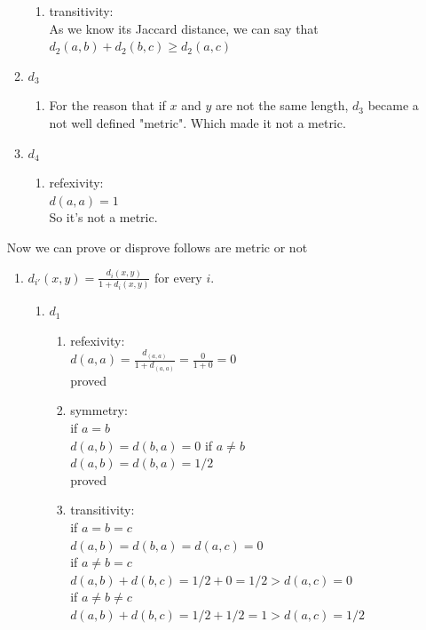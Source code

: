 \documentclass{article}
\begin{document}
\begin{enumerate}
\begin{enumerate}
\begin{enumerate}
		\item transitivity:\\
		As we know its Jaccard distance, we can say that\\
		$d_2(a,b) + d_2(b,c) \geq d_2(a,c)$\\
	\end{enumerate}
	\item $d_3$
		\begin{enumerate}
			\item For the reason that if $x$ and $y$ are not the same length, $d_3$ became a not well defined "metric". Which made it not a metric.
		\end{enumerate}
		\item $d_4$
		\begin{enumerate}
			\item refexivity:\\
			$d(a,a) = 1$\\
			So it's not a metric.
		\end{enumerate}
\end{enumerate}
Now we can prove or disprove follows are metric or not
\begin{enumerate}
\item $d_{i'}(x,y) = \frac{d_i(x,y)}{1 + d_i(x,y)}$ for every $i$.\\
\begin{enumerate}
	\item $d_1$
	\begin{enumerate}
		\item refexivity:\\
		$d(a,a) = \frac{d_(a,a)}{1 + d_(a,a)} = \frac{0}{1+0} = 0$\\
		proved
		\item symmetry: \\
		if $a = b$\\
		$d(a,b) = d(b,a) = 0$
		if $a\neq b$\\
		$d(a,b) = d(b,a) = 1/2$\\
		proved
		\item transitivity:\\
		if $a = b = c$\\
		$d(a,b) = d(b,a) = d(a,c) = 0$\\
		if $a \neq b = c$\\
		$d(a,b)  + d(b, c) = 1/2 + 0 = 1/2 > d(a,c) = 0$\\
		if $a \neq b \neq c$\\
		$d(a,b)  + d(b, c) = 1/2 + 1/2 = 1 > d(a,c) = 1/2$\\

\end{enumerate}
\end{enumerate}
\end{enumerate}
\end{enumerate}
\end{document}
